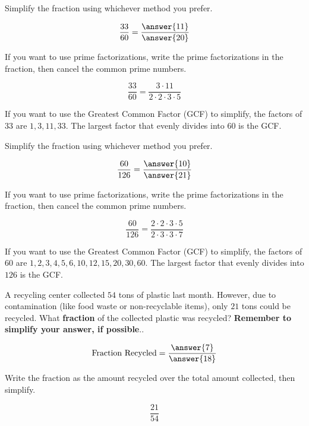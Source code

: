 \documentclass{ximera}[font=12pt]  %
\begin{document}
\begin{problem}
Simplify the fraction using whichever method you prefer.

\[ \frac{33}{60} = \frac{\answer{11}}{\answer{20}}\]

\begin{hint}
   If you want to use prime factorizations, write the prime factorizations in the fraction, then cancel the common prime numbers.

    \[ \frac{33}{60} = \frac{3 \cdot 11}{2 \cdot 2 \cdot 3 \cdot 5} \]

  \end{hint}

  \begin{hint}
    If you want to use the Greatest Common Factor (GCF) to simplify, the factors of $33$ are $1, 3, 11, 33.$  The largest factor
    that evenly divides into $60$ is the GCF.  
  \end{hint}

\end{problem}



\begin{problem}
  Simplify the fraction using whichever method you prefer.


  \[ \frac{60}{126} = \frac{\answer{10}}{\answer{21}} \]

  \begin{hint}
   If you want to use prime factorizations, write the prime factorizations in the fraction, then cancel the common prime numbers.

    \[ \frac{60}{126} = \frac{2 \cdot 2 \cdot 3 \cdot 5}{2 \cdot 3 \cdot 3 \cdot 7} \]

  \end{hint}

  \begin{hint}
    If you want to use the Greatest Common Factor (GCF) to simplify, the factors of $60$ are $1, 2, 3, 4, 5, 6, 10, 12, 15, 20, 30, 60.$  The
    largest factor that evenly divides into $126$ is the GCF. 
  \end{hint}

\end{problem}


\begin{problem}
  A recycling center collected $54$ tons of plastic last month.  However, due to contamination (like food waste or non-recyclable items), 
  only $21$ tons could be recycled.  What \textbf{fraction} of the collected plastic was recycled?  \textbf{Remember to simplify your answer, if possible}..

  \[ \text{Fraction Recycled} = \frac{\answer{7}}{\answer{18}} \]

  \begin{hint}
    Write the fraction as the amount recycled over the total amount collected, then simplify.

    \[ \frac{21}{54} \]
  \end{hint}

\end{problem}
\end{document}
